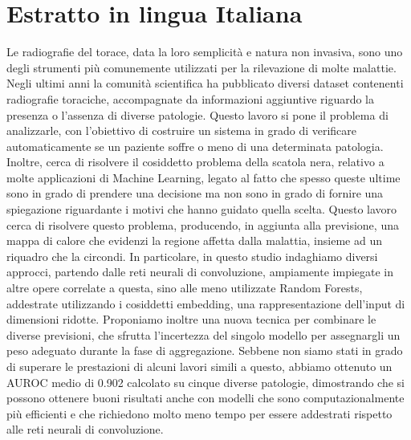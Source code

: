 \chapter*{Estratto in lingua Italiana}
\label{cha:estratto}

Le radiografie del torace, data la loro semplicità e natura non invasiva, sono uno degli strumenti più comunemente utilizzati per la rilevazione di molte malattie. Negli ultimi anni la comunità scientifica ha pubblicato diversi dataset contenenti radiografie toraciche, accompagnate da informazioni aggiuntive riguardo la presenza o l’assenza di diverse patologie.
Questo lavoro si pone il problema di analizzarle, con l'obiettivo di costruire un sistema in grado di verificare automaticamente se un paziente soffre o meno di una determinata patologia. Inoltre, cerca di risolvere il cosiddetto problema della scatola nera, relativo a molte applicazioni di Machine Learning, legato al fatto che spesso queste ultime sono in grado di prendere una decisione ma non sono in grado di fornire una spiegazione riguardante i motivi che hanno guidato quella scelta.
Questo lavoro cerca di risolvere questo problema, producendo, in aggiunta alla previsione, una mappa di calore che evidenzi la regione affetta dalla malattia, insieme ad un riquadro che la circondi. In particolare, in questo studio indaghiamo diversi approcci, partendo dalle reti neurali di convoluzione, ampiamente impiegate in altre opere correlate a questa, sino alle meno utilizzate Random Forests, addestrate utilizzando i cosiddetti embedding, una rappresentazione dell'input di dimensioni ridotte.
Proponiamo inoltre una nuova tecnica per combinare le diverse previsioni, che sfrutta l'incertezza del singolo modello per assegnargli un peso adeguato durante la fase di aggregazione. Sebbene non siamo stati in grado di superare le prestazioni di alcuni lavori simili a questo, abbiamo ottenuto un AUROC medio di 0.902 calcolato su cinque diverse patologie, dimostrando che si possono ottenere buoni risultati anche con modelli che sono computazionalmente più efficienti e che richiedono molto meno tempo per essere addestrati rispetto alle reti neurali di convoluzione.
